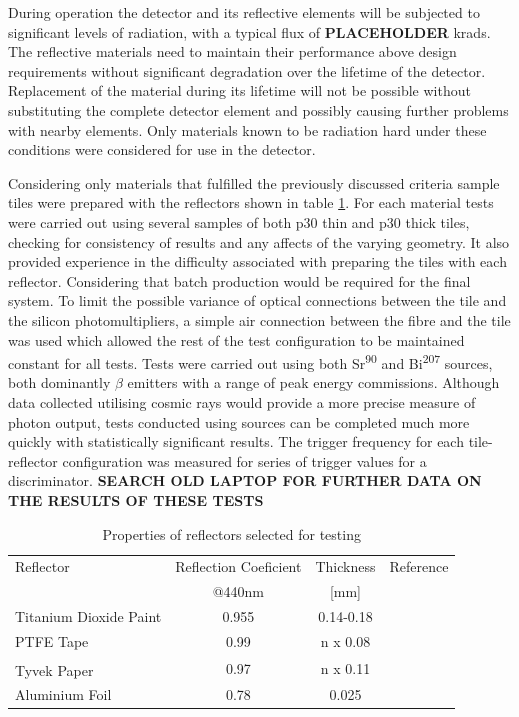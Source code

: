 During operation the detector and its reflective elements will be subjected to significant levels of radiation, with a typical flux of \textbf{PLACEHOLDER} krads. The reflective materials need to maintain their performance above design requirements without significant degradation over the lifetime of the detector. Replacement of the material during its lifetime will not be possible without substituting the complete detector element and possibly causing further problems with nearby elements. Only materials known to be radiation hard under these conditions were considered for use in the detector.  

Considering only materials that fulfilled the previously discussed criteria sample tiles were prepared with the reflectors shown in table \ref{ReflMatProp}. For each material tests were carried out using several samples of both p30 thin and p30 thick tiles, checking for consistency of results and any affects of the varying geometry. It also provided experience in the difficulty associated with preparing the tiles with each reflector. Considering that batch production would be required for the final system. To limit the possible variance of optical connections between the tile and the silicon photomultipliers, a simple air connection between the fibre and the tile was used which allowed the rest of the test configuration to be maintained constant for all tests. Tests were carried out using both Sr\textsuperscript{90} and Bi\textsuperscript{207} sources, both dominantly $\beta$ emitters with a range of peak energy commissions. Although data collected utilising cosmic rays would provide a more precise measure of photon output, tests conducted using sources can be completed much more quickly with statistically significant results. The trigger frequency for each tile-reflector configuration was measured for series of trigger values for a discriminator. \textbf{SEARCH OLD LAPTOP FOR FURTHER DATA ON THE RESULTS OF THESE TESTS}


	\begin{table}\centering
	\renewcommand{\arraystretch}{1.3}
	\begin{tabular}{ @{}l  c  c  c@{}} 
		\toprule
		Reflector & Reflection Coeficient & Thickness & Reference \\
		& {\small @440nm}& {\small [mm]}&  \\
		\midrule
		Titanium Dioxide Paint & 0.955 & 0.14-0.18 & \cite{janecek2012reflectivity}\\
		PTFE Tape & 0.99 & n x 0.08 &\cite{janecek2012reflectivity}\\
		Tyvek\textsuperscript{\textregistered} Paper & 0.97 & n x 0.11 & \cite{janecek2008optical} \\
		Aluminium Foil & 0.78 & 0.025 & \cite{janecek2008optical}\\
		\bottomrule
	\end{tabular}
	\caption{Properties of reflectors selected for testing}
	\label{ReflMatProp}
	\end{table}

